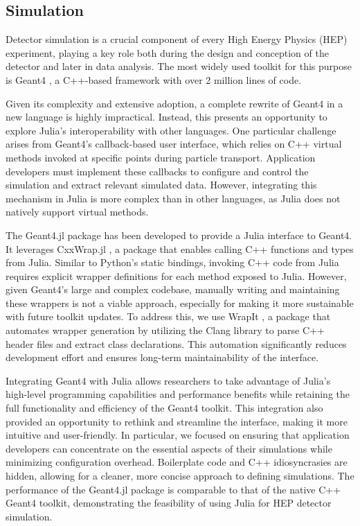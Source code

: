 \documentclass{webofc}
\begin{document}
\subsection{Simulation}

Detector simulation is a crucial component of every High Energy Physics (HEP) experiment, playing a key role both during the design and conception of the detector and later in data analysis. The most widely used toolkit for this purpose is Geant4 \cite{GEANT4:2002zbu}, a C++-based framework with over 2 million lines of code.

Given its complexity and extensive adoption, a complete rewrite of Geant4 in a new language is highly impractical. Instead, this presents an opportunity to explore Julia's interoperability with other languages. One particular challenge arises from Geant4's callback-based user interface, which relies on C++ virtual methods invoked at specific points during particle transport. Application developers must implement these callbacks to configure and control the simulation and extract relevant simulated data. However, integrating this mechanism in Julia is more complex than in other languages, as Julia does not natively support virtual methods.

The Geant4.jl \cite{geant4-jl-github} package has been developed to provide a Julia interface to Geant4. It leverages CxxWrap.jl \cite{cxxwrap-jl-github}, a package that enables calling C++ functions and types from Julia. Similar to Python’s static bindings, invoking C++ code from Julia requires explicit wrapper definitions for each method exposed to Julia. However, given Geant4's large and complex codebase, manually writing and maintaining these wrappers is not a viable approach, especially for making it more sustainable with future toolkit updates. To address this, we use WrapIt \cite{wrapit-github}, a package that automates wrapper generation by utilizing the Clang library to parse C++ header files and extract class declarations. This automation significantly reduces development effort and ensures long-term maintainability of the interface.

Integrating Geant4 with Julia allows researchers to take advantage of Julia's high-level programming capabilities and performance benefits while retaining the full functionality and efficiency of the Geant4 toolkit. This integration also provided an opportunity to rethink and streamline the interface, making it more intuitive and user-friendly. In particular, we focused on ensuring that application developers can concentrate on the essential aspects of their simulations while minimizing configuration overhead. Boilerplate code and C++ idiosyncrasies are hidden, allowing for a cleaner, more concise approach to defining simulations. The performance of the Geant4.jl package is comparable to that of the native C++ Geant4 toolkit, demonstrating the feasibility of using Julia for HEP detector simulation.
\end{document}
